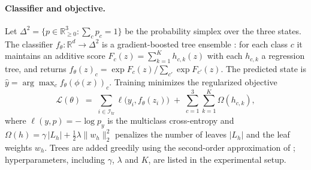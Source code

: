 \paragraph{Classifier and objective.}
Let $\Delta^{2} = \{p \in \mathbb{R}^{3}_{\ge 0} : \sum_{c} p_c = 1\}$ be the probability simplex over the three states. The classifier $f_\theta : \mathbb{R}^{d} \to \Delta^{2}$ is a gradient-boosted tree ensemble \citep{Chen_2016}: for each class $c$ it maintains an additive score $F_c(z) = \sum_{k=1}^{K} h_{c,k}(z)$ with each $h_{c,k}$ a regression tree, and returns $f_\theta(z)_c = \exp F_c(z) / \sum_{c'} \exp F_{c'}(z)$. The predicted state is $\hat{y} = \arg\max_c f_\theta(\phi(x))_c$. Training minimizes the regularized objective
\begin{equation}
\mathcal{L}(\theta) \;=\; \sum_{i \in \mathcal{I}_{\mathrm{tr}}} \ell\big(y_i, f_\theta(z_i)\big) \;+\; \sum_{c=1}^{3}\sum_{k=1}^{K} \Omega(h_{c,k}),
\label{eq:objective}
\end{equation}
where $\ell(y,p) = -\log p_{y}$ is the multiclass cross-entropy and $\Omega(h) = \gamma\,|L_h| + \tfrac{1}{2}\lambda\lVert w_h \rVert_2^2$ penalizes the number of leaves $|L_h|$ and the leaf weights $w_h$. Trees are added greedily using the second-order approximation of \citet{Chen_2016}; hyperparameters, including $\gamma$, $\lambda$ and $K$, are listed in the experimental setup.

